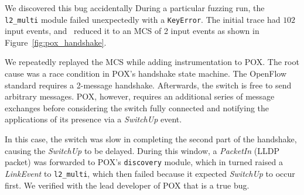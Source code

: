  We discovered this bug accidentally
During a particular fuzzing run, the
\verb=l2_multi= module failed unexpectedly with a \verb=KeyError=. The initial trace
had $102$ input events, and \projectname~reduced it to an MCS of 2 input events as shown in
Figure~\ref{fig:pox_handshake}.

We repeatedly replayed the MCS while adding
instrumentation to POX. The root cause was a race
condition in POX's handshake state machine. The OpenFlow standard
requires a 2-message handshake. Afterwards, the switch is free to send
arbitrary messages. POX, however, requires an additional series of message
exchanges before considering the switch fully connected and notifying the
applications of its presence via a \emph{SwitchUp} event.

In this case, the switch was slow in completing the second part
of the handshake, causing the \emph{SwitchUp} to be delayed. During this window,
a \emph{PacketIn} (LLDP packet) was forwarded to POX's
\verb=discovery= module, which in turned raised a \emph{LinkEvent} to
\verb=l2_multi=, which then failed because it expected \emph{SwitchUp} to occur first.
We verified with the lead developer of POX that is a true bug.


